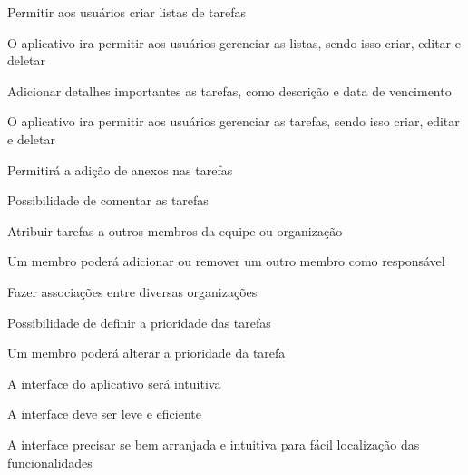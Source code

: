 \begin{enumalfa}[label=\arabic*.]{1}
    \item Permitir aos usuários criar listas de tarefas
    \subitem \begin{enumalfa}[leftmargin=0pt, topsep=0pt]{0.8}
        \item O aplicativo ira permitir aos usuários gerenciar as listas, sendo isso criar, editar e deletar
    \end{enumalfa}
    \item Adicionar detalhes importantes as tarefas, como descrição e data de vencimento
    \subitem \begin{enumalfa}[leftmargin=0pt, topsep=0pt]{0.8}
        \item O aplicativo ira permitir aos usuários gerenciar as tarefas, sendo isso criar, editar e deletar
        \item Permitirá a adição de anexos nas tarefas
        \item Possibilidade de comentar as tarefas
    \end{enumalfa}
    \item Atribuir tarefas a outros membros da equipe ou organização
    \subitem \begin{enumalfa}[leftmargin=0pt, topsep=0pt]{0.8}
        \item Um membro poderá adicionar ou remover um outro membro como responsável
        \item Fazer associações entre diversas organizações
    \end{enumalfa}
    \item Possibilidade de definir a prioridade das tarefas
    \subitem \begin{enumalfa}[leftmargin=0pt, topsep=0pt]{0.8}
        \item Um membro poderá alterar a prioridade da tarefa
    \end{enumalfa}
    \item A interface do aplicativo será intuitiva
    \subitem \begin{enumalfa}[leftmargin=0pt, topsep=0pt]{0.8}
        \item A interface deve ser leve e eficiente
        \item A interface precisar se bem arranjada e intuitiva para fácil localização das funcionalidades 
    \end{enumalfa}
\end{enumalfa}